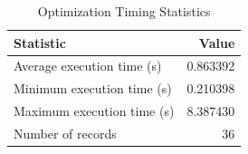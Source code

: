 
\begin{table}[h!]
\centering
\begin{tabular}{l r}
\hline
Statistic & Value \\
\hline
Average execution time (s) & 0.863392 \\
Minimum execution time (s) & 0.210398 \\
Maximum execution time (s) & 8.387430 \\
Number of records & 36 \\
\hline
\end{tabular}
\caption{Optimization Timing Statistics}
\end{table}
